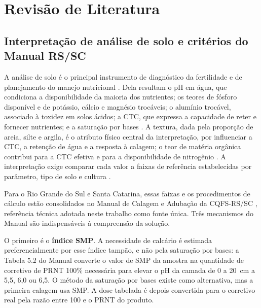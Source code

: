 
\chapter{Revisão de Literatura}\label{chap:revisao}

\section{Interpretação de análise de solo e critérios do Manual RS/SC}

A análise de solo é o principal instrumento de diagnóstico da fertilidade e de
planejamento do manejo nutricional \citep{Embrapa2011}. Dela resultam o pH em água, que
condiciona a disponibilidade da maioria dos nutrientes; os teores de fósforo disponível
e de potássio, cálcio e magnésio trocáveis; o alumínio trocável, associado à toxidez em
solos ácidos; a CTC, que expressa a capacidade de reter e fornecer nutrientes; e a
saturação por bases \citep{Embrapa2011, ManualCalagem2016}. A textura, dada pela
proporção de areia, silte e argila, é o atributo físico central da interpretação, por
influenciar a CTC, a retenção de água e a resposta à calagem; o teor de matéria orgânica
contribui para a CTC efetiva e para a disponibilidade de nitrogênio \citep{Santos2003}.
A interpretação exige comparar cada valor a faixas de referência estabelecidas por
parâmetro, tipo de solo e cultura \citep{EmbrapaDoc206}.

Para o Rio Grande do Sul e Santa Catarina, essas faixas e os procedimentos de cálculo
estão consolidados no Manual de Calagem e Adubação da CQFS-RS/SC
\citep{ManualCalagem2016}, referência técnica adotada neste trabalho como fonte única.
Três mecanismos do Manual são indispensáveis à compreensão da solução.

O primeiro é o \textbf{índice SMP}. A necessidade de calcário é estimada
preferencialmente por esse índice tampão, e não pela saturação por bases: a Tabela 5.2
do Manual converte o valor de SMP da amostra na quantidade de corretivo de PRNT 100\%
necessária para elevar o pH da camada de 0 a 20~cm a 5,5, 6,0 ou 6,5. O método da
saturação por bases existe como alternativa, mas a primeira calagem usa SMP. A dose
tabelada é depois convertida para o corretivo real pela razão entre 100 e o PRNT do
produto.

